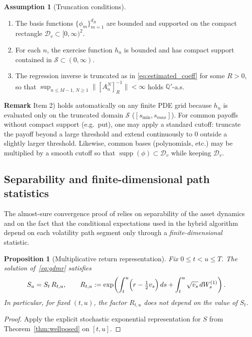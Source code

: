 \documentclass[10pt]{article}
\theoremstyle{plain}
\newtheorem{proposition}[theorem]{Proposition}
\theoremstyle{definition}
\newtheorem{assumption}[theorem]{Assumption}
\theoremstyle{remark}
\DeclareMathOperator{\supp}{supp}
\begin{document}
\begin{assumption}[Truncation conditions]
\label{ass:truncation}
\begin{enumerate}
\item The basis functions $\{\phi_m\}_{m=1}^{d_B}$ are bounded and supported on the compact rectangle
$\mathcal{D}_v\subset [0,\infty)^2$.
\item For each $n$, the exercise function $h_n$ is bounded and has compact support contained in $\mathcal{S}\subset(0,\infty)$.
\item The regression inverse is truncated as in \eqref{eq:estimated_coeff} for some $R>0$, so that
$\sup_{n\le M-1,\,N\ge 1}\|[A_n^N]^{-1}_R\| <\infty$ holds $\mathbb{Q}'$-a.s.
\end{enumerate}
\end{assumption}

\noindent\textbf{Remark}
Item 2) holds automatically on any finite PDE grid because $h_n$ is evaluated only on the truncated domain
$\mathcal{S}$ ($[s_{\min},s_{max}]$). For common payoffs without compact support (e.g.\ put), one may apply a standard cutoff:
truncate the payoff beyond a large threshold and extend continuously to $0$ outside a slightly larger threshold. Likewise, common bases (polynomials,
etc.) may be multiplied by a smooth cutoff so that $\supp(\phi)\subset\mathcal{D}_v$ while keeping $\mathcal{D}_v$.

\subsection{Separability and finite-dimensional path statistics}
\label{subsec:separability}

The almost-sure convergence proof of \citet{farahany2020mixing} relies on separability of the asset dynamics and on the
fact that the conditional expectations used in the hybrid algorithm depend on each volatility path segment only
through a \emph{finite-dimensional} statistic.

\begin{proposition}[Multiplicative return representation]
\label{prop:multiplicative_return}
Fix $0\le t<u\le T$. The solution of~\eqref{eq:gdmr} satisfies
\[
S_u = S_t\,R_{t,u},
\qquad
R_{t,u} := \exp\!\left(\int_t^u\Bigl(r-\tfrac12 v_s\Bigr)\,ds + \int_t^u \sqrt{v_s}\,dW^{(1)}_s\right).
\]
In particular, for fixed $(t,u)$, the factor $R_{t,u}$ does not depend on the value of $S_t$.
\end{proposition}

\begin{proof}
Apply the explicit stochastic exponential representation for $S$ from Theorem~\ref{thm:wellposed} on $[t,u]$.
\end{proof}
\end{document}

